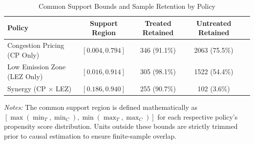 \begin{table}[htbp]
\centering
\caption{Common Support Bounds and Sample Retention by Policy}
\label{tab:unified_common_support}
\begin{tabular}{lcccc}
\toprule
Policy & Support Region & Treated Retained & Untreated Retained \\
\midrule
Congestion Pricing (CP Only) & $[0.004, 0.794]$ & 346 (91.1\%) & 2063 (75.5\%) \\
Low Emission Zone (LEZ Only) & $[0.016, 0.914]$ & 305 (98.1\%) & 1522 (54.4\%) \\
Synergy (CP $\times$ LEZ) & $[0.186, 0.940]$ & 255 (90.7\%) & 102 (3.6\%) \\
\bottomrule
\end{tabular}
\vspace{1ex}
{\raggedright \footnotesize \textit{Notes:} The common support region is defined mathematically as $[\max(\min_T, \min_C), \min(\max_T, \max_C)]$ for each respective policy's propensity score distribution. Units outside these bounds are strictly trimmed prior to causal estimation to ensure finite-sample overlap.\par}
\end{table}
